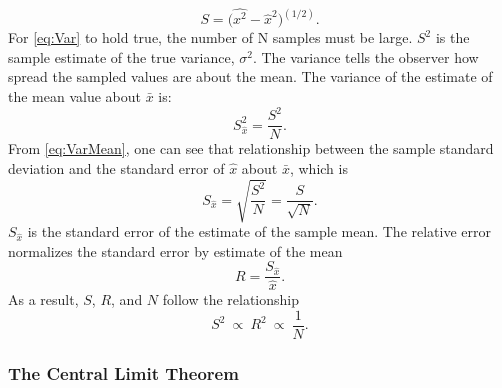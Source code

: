 \begin{equation}
  S = \big( \widehat{x^2}-\hat{x}^2 \big)^{(1/2)} .
\end{equation}
For \eqref{eq:Var} to hold true, the number of N samples must be large.
$S^2$ is the sample estimate of the true variance, $\sigma^2$. The variance
tells the observer how spread the sampled values are about the mean.
The variance of the estimate of the mean value about $\bar{x}$ is:
\begin{equation}
S^{ 2 }_{ \hat { x }  }=\frac{S^2}{N}.
\label{eq:VarMean}
\end{equation}
From \eqref{eq:VarMean}, one can see that relationship between the sample standard
deviation and the standard error of $\hat{x}$ about $\bar{x}$, which is
\begin{equation}
S_{ \hat { x }  }=\sqrt { \frac { S^{ 2 } }{ N }  } =\frac { S }{ \sqrt { N }}.
\label{eq:VarN}
\end{equation}
$S_{\hat{x}}$ is the standard error of the estimate of the sample mean.
The relative error normalizes the standard error by estimate of the mean
\begin{equation}
R = \frac{S_{ \hat { x }  }}{\hat{x}} .
\label{eq:RelativeErr}
\end{equation}
As a result, $S$, $R$, and $N$ follow the relationship
\begin{equation}
S^2\:\propto\: R^2\:\propto\:\frac{1}{N} .
\label{eq:S to R}
\end{equation}

\subsubsection{The Central Limit Theorem}
\label{subsubsec:CLT}

